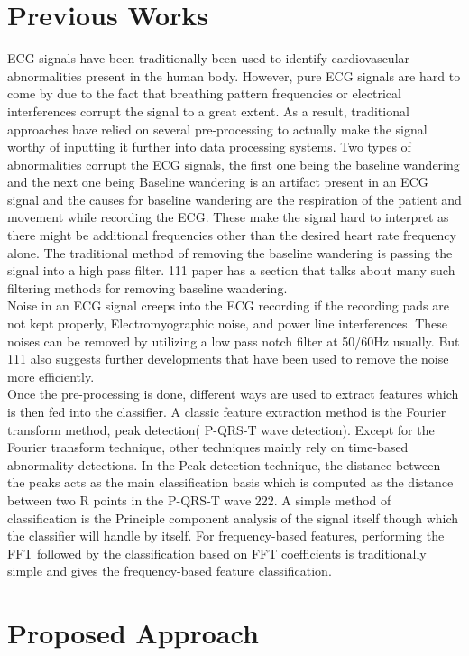 \documentclass[10pt,twocolumn,letterpaper]{article}
\begin{document}
\section{Previous Works}
ECG signals have been traditionally been used to identify cardiovascular abnormalities present in the human body. However, pure ECG signals are hard to come by due to the fact that breathing pattern frequencies or electrical interferences corrupt the signal to a great extent. As a result, traditional approaches have relied on several pre-processing to actually make the signal worthy of inputting it further into data processing systems. Two types of abnormalities corrupt the ECG signals, the first one being the baseline wandering and the next one being
Baseline wandering is an artifact present in an ECG signal and the causes for baseline wandering are the respiration of the patient and movement while recording the ECG. These make the signal hard to interpret as there might be additional frequencies other than the desired heart rate frequency alone. The traditional method of removing the baseline wandering is passing the signal into a high pass filter. 111 paper has a section that talks about many such filtering methods for removing baseline wandering.\\
Noise in an ECG signal creeps into the ECG recording if the recording pads are not kept properly, Electromyographic noise, and power line interferences. These noises can be removed by utilizing a low pass notch filter at 50/60Hz usually.  But 111 also suggests further developments that have been used to remove the noise more efficiently.\\
Once the pre-processing is done, different ways are used to extract features which is then fed into the classifier. A classic feature extraction method is the Fourier transform method, peak detection( P-QRS-T wave detection). Except for the Fourier transform technique, other techniques mainly rely on time-based abnormality detections.  In the Peak detection technique, the distance between the peaks acts as the main classification basis which is computed as the distance between two R points in the P-QRS-T wave 222. A simple method of classification is the Principle component analysis of the signal itself though which the classifier will handle by itself. For frequency-based features, performing the FFT followed by the classification based on FFT coefficients is traditionally simple and gives the frequency-based feature classification. 


\section{Proposed Approach}
\end{document}

